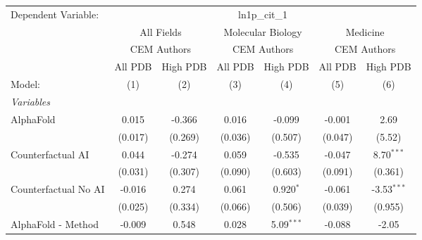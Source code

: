 \begingroup
\centering
\begin{tabular}{lcccccc}
   \tabularnewline \midrule \midrule
   Dependent Variable: & \multicolumn{6}{c}{ln1p\_cit\_1}\\
 & \multicolumn{2}{c}{All Fields} & \multicolumn{2}{c}{Molecular Biology} & \multicolumn{2}{c}{Medicine} \\
\cmidrule(lr){2-3} \cmidrule(lr){4-5} \cmidrule(lr){6-7}
 & \multicolumn{2}{c}{CEM Authors} & \multicolumn{2}{c}{CEM Authors} & \multicolumn{2}{c}{CEM Authors} \\
\cmidrule(lr){2-3} \cmidrule(lr){4-5} \cmidrule(lr){6-7}
 & \multicolumn{1}{c}{All PDB} & \multicolumn{1}{c}{High PDB} & \multicolumn{1}{c}{All PDB} & \multicolumn{1}{c}{High PDB} & \multicolumn{1}{c}{All PDB} & \multicolumn{1}{c}{High PDB} \\
\cmidrule(lr){2-2} \cmidrule(lr){3-3} \cmidrule(lr){4-4} \cmidrule(lr){5-5} \cmidrule(lr){6-6} \cmidrule(lr){7-7}
   Model:                                                     & (1)            & (2)           & (3)            & (4)           & (5)           & (6)\\  
   \midrule
   \emph{Variables}\\
   AlphaFold                                                  & 0.015          & -0.366        & 0.016          & -0.099        & -0.001        & 2.69\\   
                                                              & (0.017)        & (0.269)       & (0.036)        & (0.507)       & (0.047)       & (5.52)\\   
   Counterfactual AI                                          & 0.044          & -0.274        & 0.059          & -0.535        & -0.047        & 8.70$^{***}$\\   
                                                              & (0.031)        & (0.307)       & (0.090)        & (0.603)       & (0.091)       & (0.361)\\   
   Counterfactual No AI                                       & -0.016         & 0.274         & 0.061          & 0.920$^{*}$   & -0.061        & -3.53$^{***}$\\   
                                                              & (0.025)        & (0.334)       & (0.066)        & (0.506)       & (0.039)       & (0.955)\\   
   AlphaFold - Method                                         & -0.009         & 0.548         & 0.028          & 5.09$^{***}$  & -0.088        & -2.05\\   

\end{tabular}
